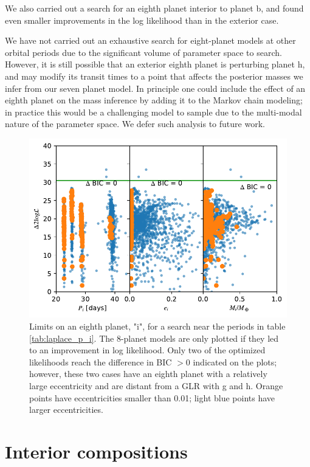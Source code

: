 \documentclass[fleqn,usenatbib]{mnras} %
\begin{document}
We also carried out a search for an eighth planet interior to planet
b, and found even smaller improvements in the log likelihood than
in the exterior case.

We have not carried out an exhaustive search for eight-planet models
at other orbital periods due to the significant volume of parameter
space to search.   However, it is still possible that an exterior
eighth planet is perturbing planet h, and may modify its transit
times to a point that affects the posterior masses we infer from
our seven planet model.   In principle one could include the effect
of an eighth planet on the mass inference by adding it to the Markov
chain modeling;  in practice this would be a challenging model to
sample due to the multi-modal nature of the parameter space.
We defer such analysis to future work.

\begin{figure}
    \centering
    \includegraphics[width=\hsize]{figures/Planet_i_properties.pdf}
    \caption{Limits on an eighth planet, "i", for a search near
    the periods in table \ref{tab:laplace_p_i}.  The 8-planet
    models are only plotted if they led to an improvement in log likelihood.  
    Only two of the optimized
    likelihoods reach the difference in BIC ${>}0$ indicated on the plots; however, these two cases have an eighth planet with a relatively large eccentricity and are distant from a GLR with g and h.  Orange points have eccentricities smaller than 0.01;  light blue points have larger eccentricities.}
    \label{fig:planet_i}
\end{figure}


\section{Interior compositions}
\label{sec:theoretical_interpretation}
\end{document}
